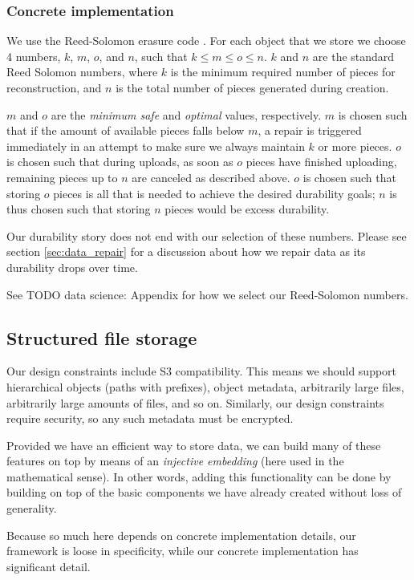 \documentclass[a4paper,10pt]{article} \usepackage[utf8]{inputenc}
\newcommand{\todo}[1]{{\color{red} TODO #1 }}
\begin{document}
\subsubsection{Concrete implementation}

We use the Reed-Solomon erasure code \cite{rs}. For each object that we store
we choose 4 numbers, $k$, $m$, $o$, and $n$, such that $k\le m\le o\le n$.
$k$ and $n$ are the standard Reed Solomon numbers, where $k$ is the minimum
required number of pieces for reconstruction, and $n$ is the total number of
pieces generated during creation.

$m$ and $o$ are the {\em minimum safe} and {\em optimal} values, respectively.
$m$ is chosen such that if the amount of available pieces falls below $m$, a
repair is triggered immediately in an attempt to make sure we always maintain
$k$ or more pieces. $o$ is chosen such that during uploads, as soon as $o$
pieces have finished uploading, remaining pieces up to $n$ are canceled as
described above. $o$ is chosen such that storing $o$ pieces is all that is
needed to achieve the desired durability goals; $n$ is thus chosen such that
storing $n$ pieces would be excess durability.

Our durability story does not end with our selection of these numbers.
Please see section \ref{sec:data_repair} for a discussion about how we repair
data as its durability drops over time.

See \todo{data science: Appendix} for how we select our Reed-Solomon numbers.

\subsection{Structured file storage}

Our design constraints include S3 compatibility. This means we should support
hierarchical objects (paths with prefixes), object metadata, arbitrarily large
files, arbitrarily large amounts of files, and so on. Similarly, our design
constraints require security, so any such metadata must be encrypted.

Provided we have an efficient way to store data, we can build many of these
features on top by means of an {\em injective embedding} (here used in the
mathematical sense). In other words, adding this functionality can be done by
building on top of the basic components we have already created without loss of
generality.

Because so much here depends on concrete
implementation details, our framework is loose in specificity, while our
concrete implementation has significant detail.
\end{document}
